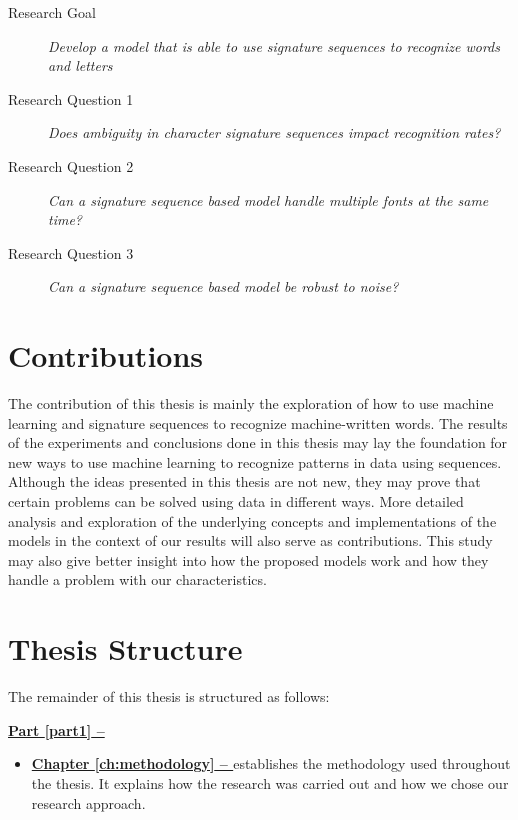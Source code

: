 \begin{description}
    \item[Research Goal]{\textit{Develop a model that is able to use signature sequences to recognize words and letters}}
    \item[Research Question 1]{\textit{Does ambiguity in character signature sequences impact recognition rates?}}
    \item[Research Question 2]{\textit{Can a signature sequence based model handle multiple fonts at the same time?}}
    \item[Research Question 3]{\textit{Can a signature sequence based model be robust to noise?}}
\end{description}


\section{Contributions}
\label{sec:contributions}
The contribution of this thesis is mainly the exploration of how to use machine learning and signature sequences to recognize machine-written words. The results of the experiments and conclusions done in this thesis may lay the foundation for new ways to use machine learning to recognize patterns in data using sequences. Although the ideas presented in this thesis are not new, they may prove that certain problems can be solved using data in different ways. More detailed analysis and exploration of the underlying concepts and implementations of the models in the context of our results will also serve as contributions. This study may also give better insight into how the proposed models work and how they handle a problem with our characteristics.


\section{Thesis Structure}
The remainder of this thesis is structured as follows:

\vspace{0.5cm}\noindent
\begin{minipage}{\linewidth}
    \textbf{{\hyperref[part1]{Part \ref{part1} -- }}}
    \begin{itemize}
        \item\textbf{\hyperref[ch:methodology]{Chapter \ref{ch:methodology} -- }} establishes the methodology used throughout the thesis. It explains how the research was carried out and how we chose our research approach.
    \end{itemize}
\end{minipage}

